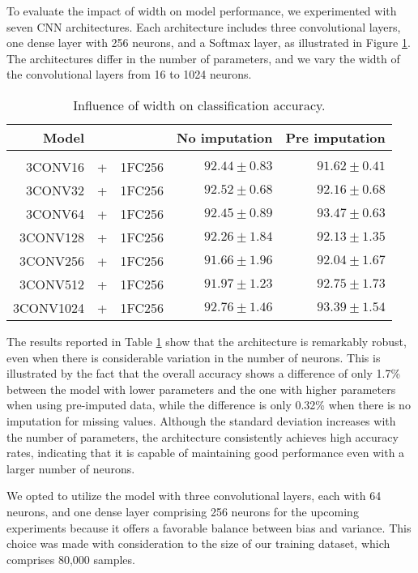 To evaluate the impact of width on model performance, we experimented with seven CNN architectures.
Each architecture includes three convolutional layers, one dense layer with 256 neurons, and a Softmax layer, as illustrated in Figure \ref{tab:temCNNwidth}.
The architectures differ in the number of parameters, and we vary the width of the convolutional layers from 16 to 1024 neurons.

 \begin{table}[!htbp]
  \centering
   \begin{tabular}{rclrr}
   Model&&                  & No imputation         & Pre imputation             \\[0.2cm]
   \hline \\[-0.2cm]
   3CONV16 &+& 1FC256    	 & $92.44 \pm 0.83$ 	 & $91.62 \pm 0.41$\\
   3CONV32 &+& 1FC256    	 & $92.52 \pm 0.68$ 	 & $92.16 \pm 0.68$\\
   3CONV64 &+& 1FC256    	 & $92.45 \pm 0.89$ 	 & $\mathbf{93.47 \pm 0.63}$\\
   3CONV128 &+& 1FC256   	 & $92.26 \pm 1.84$ 	 & $92.13 \pm 1.35$\\
   3CONV256 &+& 1FC256   	 & $91.66 \pm 1.96$ 	 & $92.04 \pm 1.67$\\
   3CONV512 &+& 1FC256   	 & $91.97 \pm 1.23$ 	 & $92.75 \pm 1.73$\\
   3CONV1024 &+& 1FC256  	 & $\mathbf{92.76 \pm 1.46}$ 	 & $93.39 \pm 1.54$\\
   \end{tabular}
   \caption{Influence of width on classification accuracy.}
   \label{tab:temCNNwidth}
 \end{table}

The results reported in Table \ref{tab:temCNNwidth} show that the architecture is remarkably robust, even when there is considerable variation in the number of neurons. This is illustrated by the fact that the overall accuracy shows a difference of only 1.7\% between the model with lower parameters and the one with higher parameters when using pre-imputed data, while the difference is only 0.32\% when there is no imputation for missing values.
Although the standard deviation increases with the number of parameters, the architecture consistently achieves high accuracy rates, indicating that it is capable of maintaining good performance even with a larger number of neurons.

We opted to utilize the model with three convolutional layers, each with 64 neurons, and one dense layer comprising 256 neurons for the upcoming experiments because it offers a favorable balance between bias and variance. This choice was made with consideration to the size of our training dataset, which comprises 80,000 samples.

